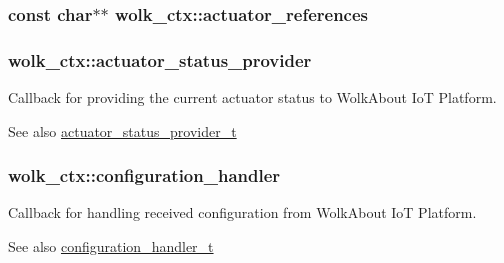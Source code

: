 \subsubsection[{\texorpdfstring{actuator\+\_\+references}{actuator_references}}]{\setlength{\rightskip}{0pt plus 5cm}const char$\ast$$\ast$ wolk\+\_\+ctx\+::actuator\+\_\+references}\hypertarget{structwolk__ctx_aa2127e8414d0d9c6214343891f4a322f}{}\label{structwolk__ctx_aa2127e8414d0d9c6214343891f4a322f}
\subsubsection[{\texorpdfstring{actuator\+\_\+status\+\_\+provider}{actuator_status_provider}}]{ wolk\+\_\+ctx\+::actuator\+\_\+status\+\_\+provider}\hypertarget{structwolk__ctx_aee7f3ef8dbcfd4f8a3817ef26a1629f6}{}\label{structwolk__ctx_aee7f3ef8dbcfd4f8a3817ef26a1629f6}
Callback for providing the current actuator status to Wolk\+About IoT Platform. \begin{DoxySeeAlso}{See also}
\hyperlink{wolk__connector_8h_af3e8919a04a293972b64605557287537}{actuator\+\_\+status\+\_\+provider\+\_\+t} 
\end{DoxySeeAlso}
\subsubsection[{\texorpdfstring{configuration\+\_\+handler}{configuration_handler}}]{ wolk\+\_\+ctx\+::configuration\+\_\+handler}\hypertarget{structwolk__ctx_a6c0926345d1d56f8fbd3cb50d8f4a804}{}\label{structwolk__ctx_a6c0926345d1d56f8fbd3cb50d8f4a804}
Callback for handling received configuration from Wolk\+About IoT Platform. \begin{DoxySeeAlso}{See also}
\hyperlink{wolk__connector_8h_a6662d0d41546795466cc2b398d8dcb08}{configuration\+\_\+handler\+\_\+t} 
\end{DoxySeeAlso}
